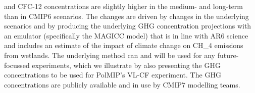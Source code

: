 and CFC-12 concentrations are slightly higher in the medium- and long-term than in CMIP6 scenarios.
The changes are driven by changes in the underlying scenarios
and by producing the underlying GHG concentration projections with an emulator (specifically the MAGICC model)
that is in line with AR6 science and includes an estimate of the impact of climate change on CH_4 emissions from wetlands.
The underlying method can and will be used for any future-focussed experiments,
which we illustrate by also presenting the GHG concentrations to be used for PolMIP's VL-CF experiment.
The GHG concentrations are publicly available and in use by CMIP7 modelling teams.
